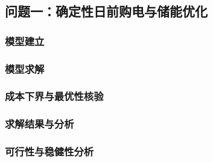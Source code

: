 \subsection{问题一：确定性日前购电与储能优化}
\subsubsection{模型建立}

\subsubsection{模型求解}

\subsubsection{成本下界与最优性核验}

\subsubsection{求解结果与分析}

\subsubsection{可行性与稳健性分析}

